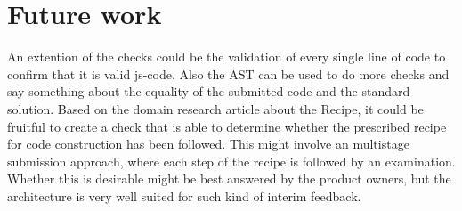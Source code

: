 \section{Future work}
An extention of the \glspl{check} could be the validation of
every single line of code to confirm that it is valid \gls{js-code}.
Also the AST can be used to do more \glspl{check} and say something about the
equality of the submitted code and the standard solution. Based on the domain 
research article about the Recipe, it could be fruitful to create a \gls{check} 
that is able to determine whether the prescribed recipe for code construction 
has been followed. This might involve an multistage submission approach, where 
each step of the recipe is followed by an examination. Whether this is desirable
might be best answered by the product owners, but the architecture is very well
suited for such kind of interim feedback.

